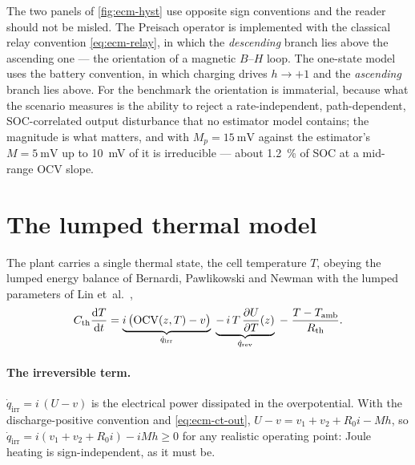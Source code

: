 \begin{remark}\label{rem:ecm-orientation}
The two panels of \cref{fig:ecm-hyst} use opposite sign conventions and the reader should not be
misled. The Preisach operator is implemented with the classical relay convention
\eqref{eq:ecm-relay}, in which the \emph{descending} branch lies above the ascending one --- the
orientation of a magnetic $B$--$H$ loop. The one-state model uses the battery convention, in which
charging drives $h\to+1$ and the \emph{ascending} branch lies above. For the benchmark the
orientation is immaterial, because what the  scenario measures is the ability to
reject a rate-independent, path-dependent, SOC-correlated output disturbance that no estimator
model contains; the magnitude is what matters, and with $M_p=\SI{15}{\milli\volt}$ against the
estimator's $M=\SI{5}{\milli\volt}$ up to \SI{10}{\milli\volt} of it is irreducible --- about
\SI{1.2}{\percent} of SOC at a mid-range OCV slope.
\end{remark}

\section{The lumped thermal model}
\label{sec:ecm-thermal}

The plant carries a single thermal state, the cell temperature $T$, obeying the lumped energy
balance of Bernardi, Pawlikowski and Newman \cite{bernardi1985energy} with the lumped parameters
of Lin et~al.~\cite{lin2014thermal},
\begin{equation}
C_{\mathrm{th}}\frac{\mathrm{d}T}{\mathrm{d}t} =
 \underbrace{i\,\big(\mathrm{OCV}(z,T) - v\big)}_{\dot{q}_{\mathrm{irr}}}
 \;\underbrace{-\,i\,T\,\frac{\partial U}{\partial T}(z)}_{\dot{q}_{\mathrm{rev}}}
 \;-\;\frac{T - T_{\mathrm{amb}}}{R_{\mathrm{th}}} .
\label{eq:ecm-thermal}
\end{equation}

\paragraph{The irreversible term.} $\dot{q}_{\mathrm{irr}} = i\,(U-v)$ is the electrical power
dissipated in the overpotential. With the discharge-positive convention and
\eqref{eq:ecm-ct-out}, $U - v = v_1 + v_2 + R_0 i - Mh$, so
$\dot{q}_{\mathrm{irr}} = i(v_1+v_2+R_0 i) - iMh \ge 0$ for any realistic operating point: Joule
heating is sign-independent, as it must be.

